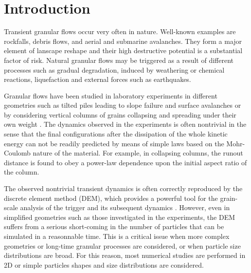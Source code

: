 \documentclass[3p,times,procedia,number]{elsarticle}
\begin{document}



\section{Introduction}
\label{sec:intro}
Transient granular flows occur very often in nature. Well-known examples are rockfalls, debris flows,
and aerial and submarine avalanches. They form a major element of lanscape reshape and their
high destructive potential is a substantial factor of risk. Natural granular flows may be triggered 
as a result of different processes such as gradual degradation, induced by weathering or chemical
reactions, liquefaction and external forces such as earthquakes.          

Granular flows have been studied in laboratory experiments in different 
geometries such as tilted piles leading to slope failure and surface avalanches 
\citep{Legros2002, Iverson1997} or by considering vertical columns 
of grains collapsing and spreading under their own weight \citep{Lajeunesse2004, 
Lajeunesse2005}. The dynamics observed in the experiments is often nontrivial 
in the sense that the final configurations after the dissipation of the whole kinetic energy  
can not be readily predicted by means of simple laws based on the Mohr-Coulomb nature 
of the material. For example, in collapsing columns, the runout distance 
is found to obey a power-law dependence upon the initial aspect ratio of the 
column. 

The observed nontrivial transient dynamics is often correctly 
reproduced by the discrete element method (DEM), which provides 
a powerful tool for the grain-scale analysis of the 
trigger and its subsequent dynamics \citep{Staron2005, Staron2009}. 
However, even in simplified geometries such as those 
investigated in the experiments, the DEM suffers from a serious 
short-coming in the number of particles that can be simulated in 
a reasonnable time. This is a critical issue when more complex geometries or 
long-time granular processes are considered, or when particle size 
distributions are broad. For this reason, most numerical studies 
are performed in 2D or simple particles shapes and size distributions 
are considered. 
\end{document}
